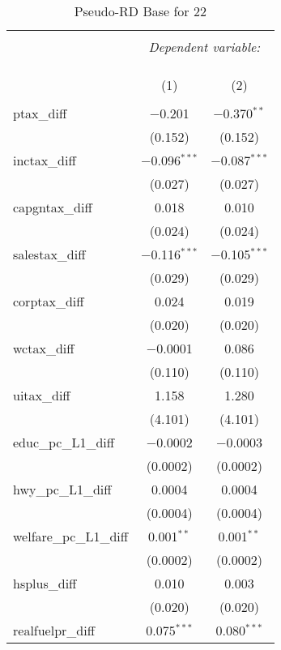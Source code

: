 
\begin{table}[!htbp] \centering 
  \caption{Pseudo-RD Base for  22} 
  \label{} 
\begin{tabular}{@{\extracolsep{5pt}}lcc} 
\\[-1.8ex]\hline 
\hline \\[-1.8ex] 
 & \multicolumn{2}{c}{\textit{Dependent variable:}} \\ 
\cline{2-3} 
\\[-1.8ex] & \multicolumn{2}{c}{ } \\ 
\\[-1.8ex] & (1) & (2)\\ 
\hline \\[-1.8ex] 
 ptax\_diff & $-$0.201 & $-$0.370$^{**}$ \\ 
  & (0.152) & (0.152) \\ 
  inctax\_diff & $-$0.096$^{***}$ & $-$0.087$^{***}$ \\ 
  & (0.027) & (0.027) \\ 
  capgntax\_diff & 0.018 & 0.010 \\ 
  & (0.024) & (0.024) \\ 
  salestax\_diff & $-$0.116$^{***}$ & $-$0.105$^{***}$ \\ 
  & (0.029) & (0.029) \\ 
  corptax\_diff & 0.024 & 0.019 \\ 
  & (0.020) & (0.020) \\ 
  wctax\_diff & $-$0.0001 & 0.086 \\ 
  & (0.110) & (0.110) \\ 
  uitax\_diff & 1.158 & 1.280 \\ 
  & (4.101) & (4.101) \\ 
  educ\_pc\_L1\_diff & $-$0.0002 & $-$0.0003 \\ 
  & (0.0002) & (0.0002) \\ 
  hwy\_pc\_L1\_diff & 0.0004 & 0.0004 \\ 
  & (0.0004) & (0.0004) \\ 
  welfare\_pc\_L1\_diff & 0.001$^{**}$ & 0.001$^{**}$ \\ 
  & (0.0002) & (0.0002) \\ 
  hsplus\_diff & 0.010 & 0.003 \\ 
  & (0.020) & (0.020) \\ 
  realfuelpr\_diff & 0.075$^{***}$ & 0.080$^{***}$ \\ 

\end{tabular}
\end{table}
